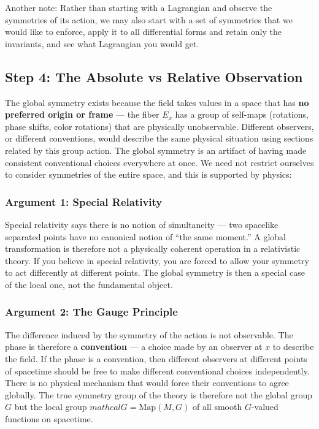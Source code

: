 \documentclass[a4paper]{article}
\begin{document}
Another note: Rather than starting with a Lagrangian and observe the symmetries of its action, we may also start with a set of symmetries that we would like to enforce, apply it to all differential forms and retain only the invariants, and see what Lagrangian you would get. 

\subsection*{Step 4: The Absolute vs Relative Observation}
The global symmetry exists because the field takes values in a space that has \textbf{no preferred origin or frame} — the fiber $E_x$ has a group of self-maps (rotations, phase shifts, color rotations) that are physically unobservable. Different observers, or different conventions, would describe the same physical situation using sections related by this group action. The global symmetry is an artifact of having made consistent conventional choices everywhere at once. We need not restrict ourselves to consider symmetries of the entire space, and this is supported by physics: 

\subsubsection*{Argument 1: Special Relativity}

Special relativity says there is no notion of simultaneity — two spacelike separated points have no canonical notion of ``the same moment.'' A global transformation is therefore not a physically coherent operation in a relativistic theory. If you believe in special relativity, you are forced to allow your symmetry to act differently at different points. The global symmetry is then a special case of the local one, not the fundamental object.

\subsubsection*{Argument 2: The Gauge Principle}

The difference induced by the symmetry of the action is not observable. The phase is therefore a \textbf{convention} --- a choice made by an observer at $x$ to  describe the field. If the phase is a convention, then different observers at different points of spacetime should be free to make different conventional choices independently. There is no physical mechanism that would force their conventions to agree globally. The true symmetry group of the theory is therefore not the global group $G$ but the local group $mathcal{G} = \mathrm{Map}(M, G)$ of all smooth $G$-valued functions on spacetime.
\end{document}
